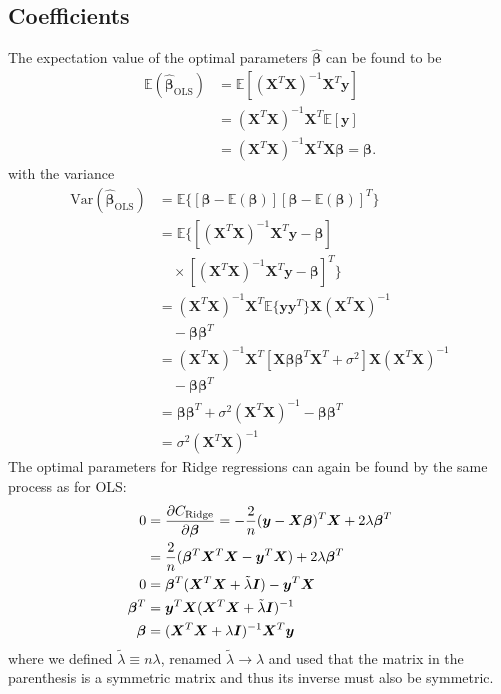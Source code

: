 \documentclass[%
reprint,
amsmath,amssymb,
aps,
pra,
]{revtex4-2}
\newcommand{\f}[2]{\frac{#1}{#2}}
\begin{document}
\subsection{Coefficients}
The expectation value of the optimal parameters $\hat{\bm\beta}$ can be found to be
\begin{align*}
	\mathbb{E}(\hat{\bm\beta}_\text{OLS})&=\mathbb{E}[ (\bm X^T\bm X)^{-1}\bm X^T\bm y]\\
	&=(\bm X^T\bm X)^{-1}\bm X^T \mathbb{E}[\bm y]\\
	&=(\bm X^T\bm X)^{-1}\bm X^T\bm X\bm\beta=\bm\beta.
\end{align*}
with the variance
\begin{align*}
	\text{Var}(\hat{\bm\beta}_\text{OLS})&=\mathbb E\{ [\bm\beta-\mathbb E(\bm\beta)] [\bm\beta-\mathbb E(\bm\beta)]^T\}\\
	&=\mathbb E\{ [(\bm X^T\bm X)^{-1}\bm X^T\bm y-\bm\beta]\\
	&\quad\times[(\bm X^T\bm X)^{-1}\bm X^T\bm y-\bm\beta]^T\}\\
	&=(\bm X^T\bm X)^{-1}\bm X^T\mathbb E\{\bm y\bm y^T\}\bm X(\bm X^T\bm X)^{-1}\\
	&\quad-\bm\beta\bm\beta^T\\
	&=(\bm X^T\bm X)^{-1}\bm X^T[\bm X\bm\beta\bm\beta^T\bm X^T+\sigma^2]\bm X(\bm X^T\bm X)^{-1}\\
	&\quad-\bm\beta\bm\beta^T\\
	&=\bm\beta\bm\beta^T+\sigma^2(\bm X^T\bm X)^{-1}-\bm\beta\bm\beta^T\\
	&=\sigma^2(\bm X^T \bm X)^{-1}
\end{align*}
The optimal parameters for Ridge regressions can again be found by the same process as for OLS:
\begin{align*}
	0&=\pdv{C_\text{Ridge}}{\bm{\beta}}=-\f2n(\bm{y}-\bm{X}\bm{\beta})^T\bm{X}+2\lambda\bm{\beta}^T\\
	&=\f2n(\bm{\beta}^T\bm{X}^T\bm{X}-\bm{y}^T\bm{X})+2\lambda\bm{\beta}^T\\
	0&=\bm{\beta}^T(\bm{X}^T\bm{X}+\tilde{\lambda}\bm{I})-\bm{y}^T\bm{X}\\
	\bm{\beta}^T&=\bm{y}^T\bm{X}(\bm{X}^T\bm{X}+\tilde{\lambda}\bm{I})^{-1}\\
	\bm{\beta}&=(\bm{X}^T\bm{X}+\lambda\bm{I})^{-1}\bm{X}^T\bm{y}
\end{align*}
where we defined $\tilde{\lambda}\equiv n\lambda$, renamed $\tilde{\lambda}\to\lambda$ and used that the matrix in the parenthesis is a symmetric matrix and thus its inverse must also be symmetric. 
\end{document}
